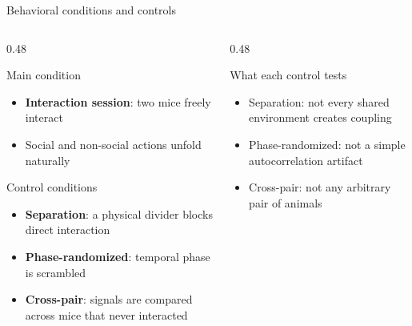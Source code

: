 \documentclass[aspectratio=169,11pt]{beamer}
\begin{document}
\begin{frame}{Behavioral conditions and controls}
\begin{columns}[T]
  \begin{column}{0.48\textwidth}
    \begin{block}{Main condition}
    \begin{itemize}
      \item \textbf{Interaction session}: two mice freely interact
      \item Social and non-social actions unfold naturally
    \end{itemize}
    \end{block}
    \begin{block}{Control conditions}
    \begin{itemize}
      \item \textbf{Separation}: a physical divider blocks direct interaction
      \item \textbf{Phase-randomized}: temporal phase is scrambled
      \item \textbf{Cross-pair}: signals are compared across mice that never interacted
    \end{itemize}
    \end{block}
  \end{column}
  \begin{column}{0.48\textwidth}
    \begin{alertblock}{What each control tests}
    \begin{itemize}
      \item Separation: not every shared environment creates coupling
      \item Phase-randomized: not a simple autocorrelation artifact
      \item Cross-pair: not any arbitrary pair of animals
    \end{itemize}
    \end{alertblock}
  \end{column}
\end{columns}
\end{frame}
\end{document}

